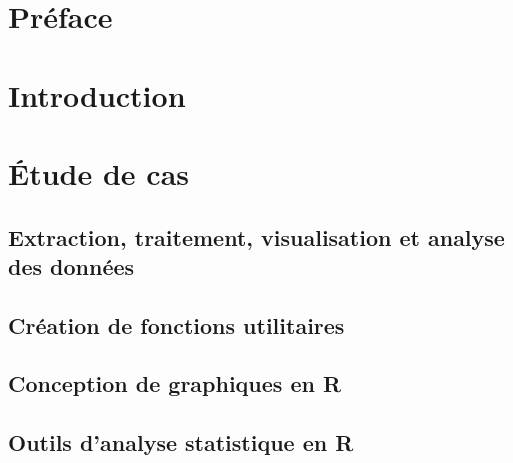 \documentclass{report}
\newcommand*{\titlePage}{
	\begingroup 
		\hbox{
			\hspace*{0.1\textwidth}
			\rule{1.5pt}{\textheight}
			\hspace*{0.05\textwidth}
			\parbox[b]{0.75\textwidth}{
				{\noindent\LARGE\bfseries Étude de cas:} \\[\baselineskip]
				{\noindent\Huge\bfseries Analyse de marché du} \\
				{\noindent\Huge\bfseries transport aérien} \\
				{\noindent\Huge\bfseries canadien avec R} \\[2\baselineskip]
				{\large\textit{Atelier d'introduction à R}}\\[4\baselineskip]
				{\Large\textsc{Beauchemin, David}} \\[\baselineskip]
				{\Large\textsc{Cabral Cruz, Samuel}} \\[\baselineskip]
				{\Large\textsc{Goulet, Vincent}} \\[4\baselineskip]
				{\large {Dans le cadre du colloque R à Québec}} \\[\baselineskip]
				{\large {25 mai 2017}} 
				\vspace{0.4\textheight}}}\endgroup}
\begin{document}
\renewcommand{\labelitemi}{\tiny $\blacktriangleright$}
\renewcommand{\labelitemii}{\footnotesize $\bullet$}
\renewcommand{\labelitemiii}{\tiny \ding{117}}
\renewcommand{\labelitemiv}{\small $\star$}

\begin{titlepage}
	\clearpage\thispagestyle{empty}
	\titlePage
\end{titlepage}
\tableofcontents
\listoffigures
{}
\lstlistoflistings
{}
\listoftables
{}
\chapter*{Préface}
	

\chapter*{Introduction}
\setcounter{chapter}{1}
	

\chapter*{Étude de cas}
	
\section{Extraction, traitement, visualisation et analyse des données}
	

\newpage
\section{Création de fonctions utilitaires}
	

\newpage
\section{Conception de graphiques en R}
	

\section{Outils d'analyse statistique en R}
	
\end{document}
